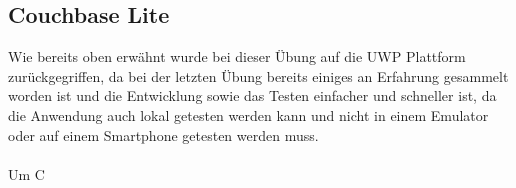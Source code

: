 \subsection{Couchbase Lite}

Wie bereits oben erwähnt wurde bei dieser Übung auf die UWP Plattform zurückgegriffen, da bei der letzten Übung bereits einiges an Erfahrung gesammelt worden ist und die Entwicklung sowie das Testen einfacher und schneller ist, da die Anwendung auch lokal getesten werden kann und nicht in einem Emulator oder auf einem Smartphone getesten werden muss.
\\\\
Um C
